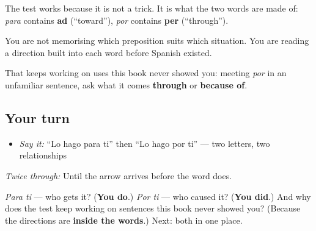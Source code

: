 \begin{culture}
The test works because it is not a trick. It is what the two words are made of: \emph{para} contains \textbf{ad} (\textquotedblleft{}toward\textquotedblright{}), \emph{por} contains \textbf{per} (\textquotedblleft{}through\textquotedblright{}).

You are not memorising which preposition suits which situation. You are reading a direction built into each word before Spanish existed.

That keeps working on uses this book never showed you: meeting \emph{por} in an unfamiliar sentence, ask what it comes \textbf{through} or \textbf{because of}.
\end{culture}

\subsection*{Your turn}
\begin{itemize}
\raggedright
  \item \emph{Say it:} \textquotedblleft{}Lo hago para ti\textquotedblright{} then \textquotedblleft{}Lo hago por ti\textquotedblright{} — two letters, two relationships
\end{itemize}

\emph{Twice through:} Until the arrow arrives before the word does.

\begin{tcolorbox}[breakable,colback=teal!4,colframe=teal!35!black,title={Before you move on}]
\emph{Para ti} — who gets it? (\textbf{You do}.) \emph{Por ti} — who caused it? (\textbf{You did}.) And why does the test keep working on sentences this book never showed you? (Because the directions are \textbf{inside the words}.) Next: both in one place.
\end{tcolorbox}
